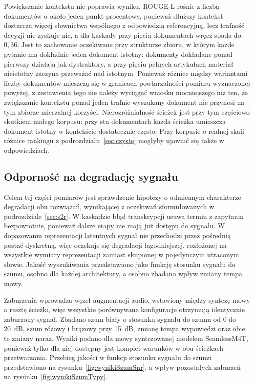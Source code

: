 Powiększanie kontekstu nie poprawia wyniku. ROUGE-L rośnie z liczbą dokumentów o około jeden
punkt procentowy, ponieważ dłuższy kontekst dostarcza więcej słownictwa wspólnego z odpowiedzią
referencyjną, lecz trafność decyzji nie zyskuje nic, a dla kaskady przy pięciu dokumentach
wręcz spada do $0{,}36$. Jest to zachowanie oczekiwane przy strukturze zbioru, w którym każde
pytanie ma dokładnie jeden dokument istotny: dokumenty dokładane ponad pierwszy działają jak
dystraktory, a przy pięciu pełnych artykułach materiał nieistotny zaczyna przeważać nad
istotnym. Ponieważ różnice między wariantami liczby dokumentów mieszczą się w granicach
powtarzalności pomiaru wyznaczonej powyżej, z zestawienia tego nie należy wyciągać wniosku
mocniejszego niż ten, że zwiększanie kontekstu ponad jeden trafnie wyszukany dokument nie
przynosi na tym zbiorze mierzalnej korzyści. Nierozróżnialność ścieżek jest przy tym częściowo
skutkiem małego korpusu: przy stu dokumentach każda ścieżka umieszcza dokument istotny
w kontekście dostatecznie często. Przy korpusie o realnej skali różnice rankingu
z podrozdziału~\ref{sec:czyste} mogłyby ujawnić się także w odpowiedziach.

\subsection{Odporność na degradację sygnału}
\label{sec:odpornosc}
Celem tej części pomiarów jest sprawdzenie hipotezy o odmiennym charakterze degradacji obu
rozwiązań, wynikającej z oczekiwań sformułowanych w podrozdziale~\ref{sec:s2r}. W kaskadzie błąd
transkrypcji usuwa termin z zapytania bezpowrotnie, ponieważ dalsze etapy nie mają już dostępu do
sygnału. W dopasowaniu reprezentacji latentnych sygnał nie przechodzi przez pośrednią postać
dyskretną, więc oczekuje się degradacji łagodniejszej, rozłożonej na wszystkie wymiary
reprezentacji zamiast skupionej w pojedynczym utraconym słowie. Jakość wyszukiwania przedstawiono
jako funkcję stosunku sygnału do szumu, osobno dla każdej architektury, a osobno zbadano wpływ
zmiany tempa mowy.

Zaburzenia wprowadza węzeł augmentacji audio, wstawiony między syntezę mowy a resztę ścieżki, więc
wszystkie porównywane konfiguracje otrzymują identycznie zaburzony sygnał. Zbadano szum biały
o stosunku sygnału do szumu od 0 do 20~dB, szum różowy i brązowy przy 15~dB, zmianę tempa
wypowiedzi oraz obie te zmiany naraz. Wyniki podano dla mowy syntezowanej modelem SeamlessM4T,
ponieważ tylko dla niej dostępny jest komplet warunków w obu ścieżkach przetwarzania. Przebieg
jakości w funkcji stosunku sygnału do szumu przedstawiono na rysunku~\ref{fig:wynikiSzumSnr},
a wpływ pozostałych zaburzeń na rysunku~\ref{fig:wynikiSzumTypy}.


